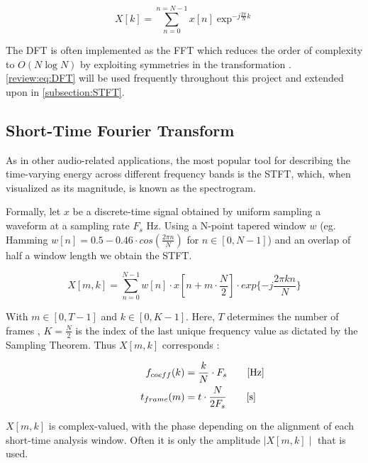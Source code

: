 \begin{equation}
  X[k] =\sum_{n=0}^{n=N-1} x[n] \exp^{-j \frac{2 \pi}{N} k }
  \label{review:eq:DFT}
\end{equation}

The \ac{DFT} is often implemented as the \ac{FFT} which reduces the
order of complexity to $O(N\log{N})$ by exploiting symmetries in the
transformation \cite{OppenheimDSP}. \autoref{review:eq:DFT} will be used
frequently throughout this project and extended upon in
\autoref{subsection:STFT}.

\subsection{Short-Time Fourier Transform}
\label{subsection:STFT}

As in other audio-related applications, the most popular tool for describing the
time-varying energy across different frequency bands is the \ac{STFT}, which,
when visualized as its magnitude, is known as the spectrogram.

Formally, let $x$ be a discrete-time signal obtained by uniform sampling a
waveform at a sampling rate $F_{s}$ Hz. Using a N-point tapered window $w$ (eg.
Hamming $w[n] = 0.5-0.46\cdot cos(\frac{2\pi n}{N})$ for
$n\in\left[0,N-1\right]$) and an overlap of half a window length we obtain the
STFT.

\begin{equation}
  X [m,k] = \sum_{n=0}^{N-1}w[n]\cdot x[n + m\cdot\frac{N}{2}]\cdot exp\{-j\frac{2\pi k n }{N}\}
\end{equation}

With $m\in\left[0,T-1\right]$ and $k\in\left[0,K-1\right]$. Here, $T$ determines
the number of frames , $K = \frac{N}{2}$ is the index of the last unique
frequency value as dictated by the Sampling Theorem. Thus $X[m,k]$ corresponds :

\begin{equation}
  \begin{aligned}
    f_{coeff}(k) & = \frac{k}{N} \cdot F_{s} \mathrlap{\qquad [\si{\hertz}]}   \\
    t_{frame}(m) & = t \cdot \frac{N}{2F_{s}} \mathrlap{\qquad [\si{\second}]}
  \end{aligned}
  \label{review:eq:tradeoff}
\end{equation}

$X[m,k]$ is complex-valued, with the phase depending on the alignment of each
short-time analysis window. Often it is only the amplitude $\mid X[m,k] \mid$
that is used.
\cite{OppenheimDSP}


